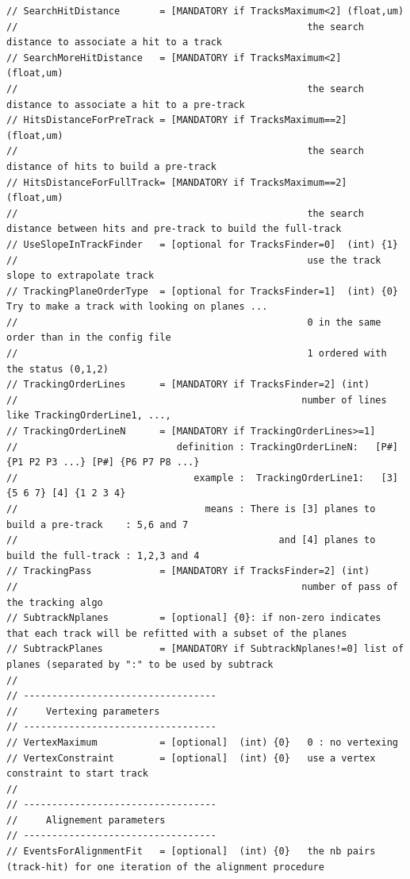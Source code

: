 \documentclass[a4paper, 12pt, twoside]{article}
\begin{document}
\begin{verbatim}
// SearchHitDistance       = [MANDATORY if TracksMaximum<2] (float,um)
//                                                   the search distance to associate a hit to a track
// SearchMoreHitDistance   = [MANDATORY if TracksMaximum<2]   (float,um)
//                                                   the search distance to associate a hit to a pre-track 
// HitsDistanceForPreTrack = [MANDATORY if TracksMaximum==2]   (float,um)
//                                                   the search distance of hits to build a pre-track 
// HitsDistanceForFullTrack= [MANDATORY if TracksMaximum==2]   (float,um)
//                                                   the search distance between hits and pre-track to build the full-track 
// UseSlopeInTrackFinder   = [optional for TracksFinder=0]  (int) {1}
//                                                   use the track slope to extrapolate track
// TrackingPlaneOrderType  = [optional for TracksFinder=1]  (int) {0} Try to make a track with looking on planes ...
//                                                   0 in the same order than in the config file
//                                                   1 ordered with the status (0,1,2)
// TrackingOrderLines      = [MANDATORY if TracksFinder=2] (int) 
//                                                  number of lines like TrackingOrderLine1, ..., 
// TrackingOrderLineN      = [MANDATORY if TrackingOrderLines>=1] 
//                            definition : TrackingOrderLineN:   [P#] {P1 P2 P3 ...} [P#] {P6 P7 P8 ...}
//                               example :  TrackingOrderLine1:   [3] {5 6 7} [4] {1 2 3 4}
//                                 means : There is [3] planes to build a pre-track    : 5,6 and 7
//                                              and [4] planes to build the full-track : 1,2,3 and 4
// TrackingPass            = [MANDATORY if TracksFinder=2] (int) 
//                                                  number of pass of the tracking algo
// SubtrackNplanes         = [optional] {0}: if non-zero indicates that each track will be refitted with a subset of the planes
// SubtrackPlanes          = [MANDATORY if SubtrackNplanes!=0] list of planes (separated by ":" to be used by subtrack
//
// ----------------------------------
//     Vertexing parameters
// ----------------------------------
// VertexMaximum           = [optional]  (int) {0}   0 : no vertexing
// VertexConstraint        = [optional]  (int) {0}   use a vertex constraint to start track
//
// ----------------------------------
//     Alignement parameters
// ----------------------------------
// EventsForAlignmentFit   = [optional]  (int) {0}   the nb pairs (track-hit) for one iteration of the alignment procedure


\end{verbatim}
\end{document}
